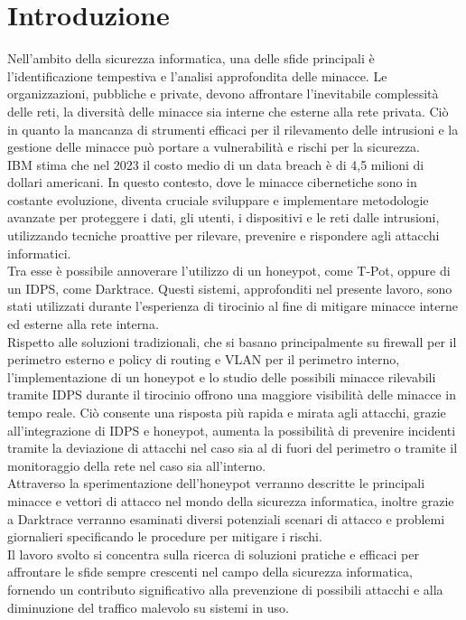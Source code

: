 \chapter{Introduzione}
Nell'ambito della sicurezza informatica, una delle sfide principali è l'identificazione tempestiva e l'analisi approfondita delle minacce. Le organizzazioni, pubbliche e private, devono affrontare l'inevitabile complessità delle reti, la diversità delle minacce sia interne che esterne alla rete privata. Ciò in quanto la mancanza di strumenti efficaci per il rilevamento delle intrusioni e la gestione delle minacce può portare a vulnerabilità e rischi per la sicurezza.\\
IBM stima che nel 2023 il costo medio di un data breach è di 4,5 milioni di dollari americani. In questo contesto, dove le minacce cibernetiche sono in costante evoluzione, diventa cruciale sviluppare e implementare metodologie avanzate per proteggere i dati, gli utenti, i dispositivi e le reti dalle intrusioni, utilizzando tecniche proattive per rilevare, prevenire e rispondere agli attacchi informatici.\\
Tra esse è possibile annoverare l’utilizzo di un honeypot, come T-Pot, oppure di un IDPS, come Darktrace. Questi sistemi, approfonditi nel presente lavoro, sono stati utilizzati durante l’esperienza di tirocinio al fine di mitigare minacce interne ed esterne alla rete interna.\\
Rispetto alle soluzioni tradizionali, che si basano principalmente su firewall per il perimetro esterno e policy di routing e VLAN per il perimetro interno, l'implementazione di un honeypot e lo studio delle possibili minacce rilevabili tramite IDPS durante il tirocinio offrono una maggiore visibilità delle minacce in tempo reale. Ciò consente una risposta più rapida e mirata agli attacchi, grazie all'integrazione di IDPS e honeypot, aumenta la possibilità di prevenire incidenti tramite la deviazione di attacchi nel caso sia al di fuori del perimetro o tramite il monitoraggio della rete nel caso sia all'interno.\\
Attraverso la sperimentazione dell'honeypot verranno descritte le principali minacce e vettori di attacco nel mondo della sicurezza informatica, inoltre grazie a Darktrace verranno esaminati diversi potenziali scenari di attacco e problemi giornalieri specificando le procedure per mitigare i rischi.\\
Il lavoro svolto si concentra sulla ricerca di soluzioni pratiche e efficaci per affrontare le sfide sempre crescenti nel campo della sicurezza informatica, fornendo un contributo significativo alla prevenzione di possibili attacchi e alla diminuzione del traffico malevolo su sistemi in uso.
